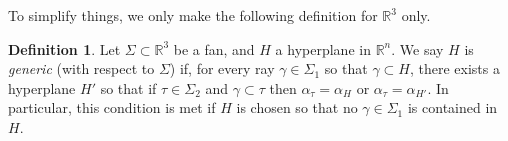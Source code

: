 \documentclass[11pt, reqno]{amsart}
\newcommand{\RR}{\mathbb{R}}
\theoremstyle{definition}
\newtheorem{definition}[theorem]{Definition}
\theoremstyle{remark}
\numberwithin{equation}{section}
\begin{document}
To simplify things, we only make the following definition for $\RR^3$ only.

\begin{definition}
Let $\Sigma\subset \RR^3$ be a fan, and $H$ a hyperplane in $\RR^n$.  We say $H$ is \textit{generic} (with respect to $\Sigma$) if, for every ray $\gamma\in\Sigma_{1}$ so that $\gamma\subset H$, there exists a hyperplane $H'$ so that if $\tau\in\Sigma_{2}$ and $\gamma\subset\tau$ then $\alpha_\tau=\alpha_H$ or $\alpha_\tau=\alpha_{H'}$.  In particular, this condition is met if $H$ is chosen so that no $\gamma\in\Sigma_{1}$ is contained in $H$.
\end{definition}





\end{document}
